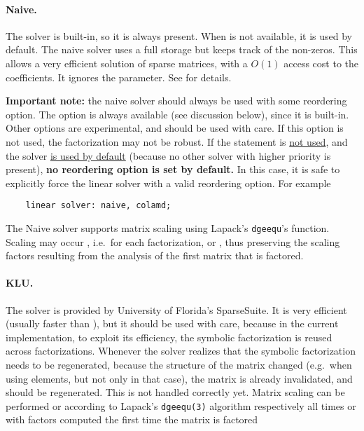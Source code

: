 \paragraph{Naive.}
The  solver is built-in, so it is always present.
When  is not available, it is used by default.
The naive solver uses a full storage but keeps track of the non-zeros.
This allows a very efficient solution of sparse matrices, with
a $O(1)$ access cost to the coefficients.
It ignores the  parameter.
See \cite{NAIVE-2007} for details.

\bigskip
\begin{minipage}{.9\textwidth}
\textbf{Important note:} the naive solver should always be used
with some reordering option.
The  option is always available (see discussion below),
since it is built-in.
Other options are experimental, and should be used with care.
If this option is not used, the factorization may not be robust.
If the  statement is \underline{not used},
and the  solver \underline{is used by default}
(because no other solver with higher priority is present),
\textbf{no reordering option is set by default.}
In this case, it is safe to explicitly force the linear solver
with a valid reordering option.  For example
\begin{verbatim}
    linear solver: naive, colamd;
\end{verbatim}
\end{minipage}

\bigskip

\noindent
The Naive solver supports matrix scaling using Lapack's \texttt{dgeequ}'s
function.
Scaling may occur , i.e.\ for each factorization,
or , thus preserving the scaling factors resulting
from the analysis of the first matrix that is factored.

\paragraph{KLU.}
The  solver is provided by University of Florida's SparseSuite.
It is very efficient (usually faster than ),
but it should be used with care, because in the current implementation,
to exploit its efficiency, the symbolic factorization is reused across
factorizations.
Whenever the solver realizes that the symbolic factorization
needs to be regenerated, because the structure of the matrix changed
(e.g.\ when using  elements, but not only in that case),
the matrix is already invalidated, and should be regenerated.
This is not handled correctly yet.
Matrix scaling can be performed  or  
according to Lapack's \texttt{dgeequ(3)} algorithm
respectively all times or with factors computed the first time
the matrix is factored


